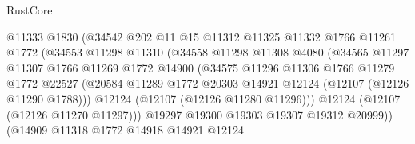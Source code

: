 \begin{lexlean}{RustCore}
\begin{coremodule}
                                @11333
                                @1830
                                (@34542
                                  @202
                                  @11
                                  @15
                                  @11312
                                  @11325
                                  @11332
                                  @1766
                                  @11261
                                  @1772
                                  (@34553
                                    @11298
                                    @11310
                                    (@34558
                                      @11298
                                      @11308
                                      @4080
                                      (@34565
                                        @11297
                                        @11307
                                        @1766
                                        @11269
                                        @1772
                                        @14900
                                        (@34575
                                          @11296
                                          @11306
                                          @1766
                                          @11279
                                          @1772
                                          @22527
                                          (@20584
                                            @11289
                                            @1772
                                            @20303
                                            @14921
                                            @12124
                                            (@12107 (@12126 @11290 @1788)))
                                          @12124
                                          (@12107 (@12126 @11280 @11296)))
                                        @12124
                                        (@12107 (@12126 @11270 @11297)))
                                      @19297
                                      @19300
                                      @19303
                                      @19307
                                      @19312
                                      @20999))
                                  (@14909
                                    @11318
                                    @1772
                                    @14918
                                    @14921
                                    @12124

\end{coremodule}
\end{lexlean}

